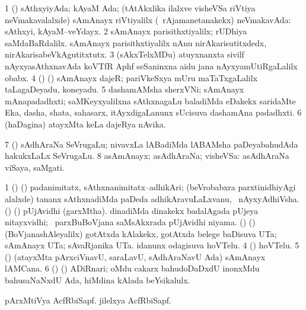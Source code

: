 \noindent
\gl{\pagu}
\bmng
\bnum
\num{1}  (\birx) sAthxyiyAda; kAyaM Ada; (tAtAkxlika ilalxve visheVSa riVtiya neVmakavalalxde) sAmAnayx riVtiyalilx (\kanmu\ rAjamanetanakekx) neVmakavAda:  sAthxyi, kAyaM--veYdayx. 
\num{2}  sAmAnayx parisithxtiyalilx; rUDhiya saMdaBaRdalilx.  sAmAnayx parisithxtiyalilx nAnu nirAkarisutitxdedx, nirAkarisabeVkAgutitxtutx. 
\num{3}  (sAkxTelxMDu) atuyxnanxta sivilf nAyxyasAthxnavAda koVTfR Aphf seSaninxna aidu jana nAyxyamUtiRgaLalilx obabx. 
\num{4}  (\birx) (\ca) sAmAnayx dajeR;  pariVkeSxya mUru maTaTxgaLalilx taLagaDeyadu, koneyadu. 
\num{5}  dashamAMsha sherxVNi; sAmAnayx mAnapadadhxti; saMKeyxyalilxna sAthxnagaLu baladiMda eDakekx saridaMte Eka, dasha, shata, sahasarx, itAyxdigaLanunx sUcisuva dashamAna padadhxti. 
\num{6}  (haDagina) atayxMta keLa dajeRya nAvika. 
\num{7}  (\birx) sAdhAraNa SeVrugaLu; nivavxLa lABadiMda lABAMsha paDeyabahudAda hakukxLaLx SeVrugaLu. 
\num{8}  asAmAnayx; asAdhAraNa; visheVSa:  asAdhAraNa viSaya, saMgati. 
\enum
\emng
\eentry

\bentry
{}
\gl{\nA}
\bmng
\bnum
\num{1} (\birx) (\nAyxshA) padanimitatx, sAthxnanimitatx--adhikAri; (beVrobabxra parxtinidhiyAgi alalxde) tananx sAthxnadiMda paDeda adhikAravuLaLxvanu, \kanmu\ nAyxyAdhiVsha. 
 () (\kerxY) 
\banum
{} pUjAvidhi (garxMtha). 
 dinadiMda dinakekx badalAgada pUjeya nitayxvidhi; \kanmu\ parxBuBoVjana saMsAkxrada pUjAvidhi niyama. 
\eanum
\numie
{} (\birx) (\ca) 
\banum
{} (BoVjanashAleyalilx) gotAtxda kAlakekx, gotAtxda belege baDisuva UTa; sAmAnayx UTa; sAvaRjanika UTa. 
 idanunx odagisuva hoVTelu. 
\eanum
\numie
\num{4} (\ame) hoVTelu. 
\num{5} (\vaMlAM) (atayxMta pArxciVnavU, saraLavU, sAdhAraNavU Ada) sAmAnayx lAMCana. 
\num{6} (\ame) (\ca) ADiRnari; oMdu cakarx bahudoDaDxdU inonxMdu bahusaNaNxdU Ada, hiMdina kAlada beYsikalulx.  
\enum
\emng

\noindent
\gl{\pagu}
\bmng
{} 
\banum
{} pArxMtiVya AcfRbiSapf. 
 jilelxya AcfRbiSapf. 
\eanum
\emng
\eentry

